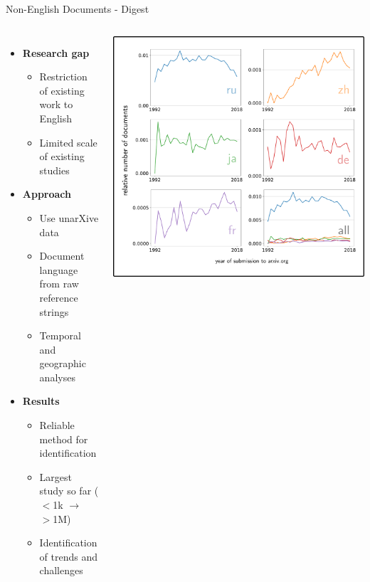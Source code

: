 \documentclass[en,16:9,smallfoot]{sdqbeamer}
\begin{document}
   \begin{frame}{Non-English Documents - Digest}

   \begin{columns}
        \vspace{-1cm}
        \begin{itemize}
            \item \textbf{Research gap}
            \begin{itemize}
                \item Restriction of existing work to English
                \item Limited scale of existing studies
            \end{itemize}
            \item \textbf{Approach}
            \begin{itemize}
                \item Use unarXive data
                \item Document language from raw reference strings
                \item Temporal and geographic analyses
            \end{itemize}
            \item \textbf{Results}
            \begin{itemize}
                \item Reliable method for identification
                \item Largest study so far ($<$1k $\rightarrow$ $>$1M)
                \item Identification of trends and challenges
            \end{itemize}
        \end{itemize}
            \includegraphics[width=0.8\linewidth]{imgs/xling_example_result}

\end{columns}
\end{frame}
\end{document}
